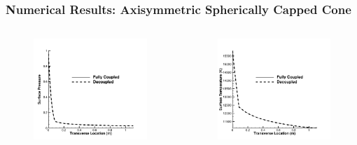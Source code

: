 \documentclass{beamer}
\begin{document}
\begin{frame}
  \frametitle{Numerical Results: Axisymmetric Spherically Capped Cone}
    \begin{columns}[t]
      \begin{column}{0.5\textwidth}
        \begin{figure}[h!]
          \includegraphics[width=\textwidth]{figures/surface_pressure_cone}
        \end{figure}
      \end{column}
      \begin{column}{0.5\textwidth}
        \begin{figure}[h!]
          \includegraphics[width=\textwidth]{figures/surface_temperature_cone}

\end{figure}
\end{column}
\end{columns}
\end{frame}
\end{document}
